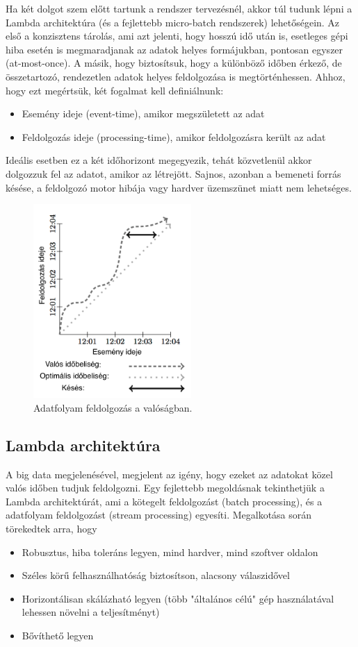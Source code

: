 \documentclass[a4paper,12pt]{article}
\begin{document}
Ha két dolgot szem előtt tartunk a rendszer tervezésnél, akkor túl tudunk lépni a Lambda architektúra (és a fejlettebb micro-batch rendszerek\cite{microbatch}) lehetőségein. Az első a konzisztens tárolás, ami azt jelenti, hogy hosszú idő után is, esetleges gépi hiba esetén is megmaradjanak az adatok helyes formájukban, pontosan egyszer (at-most-once). A másik, hogy biztosítsuk, hogy a különböző időben érkező, de összetartozó, rendezetlen adatok helyes feldolgozása is megtörténhessen. Ahhoz, hogy ezt megértsük, két fogalmat kell definiálnunk:
\begin{itemize}
\item Esemény ideje (event-time), amikor megszületett az adat
\item Feldolgozás ideje (processing-time), amikor feldolgozásra került az adat
\end{itemize}
Ideális esetben ez a két időhorizont megegyezik, tehát közvetlenül akkor dolgozzuk fel az adatot, amikor az létrejött. Sajnos, azonban a bemeneti forrás késése, a feldolgozó motor hibája vagy hardver üzemszünet miatt nem lehetséges. 
 
\begin{figure}[ht!]
\centering
\includegraphics[width=60mm]{img/skew.png}
\caption{Adatfolyam feldolgozás a valóságban.\cite{skew} \label{skew}} 
\end{figure}

\subsection{Lambda architektúra}
A big data megjelenésével, megjelent az igény, hogy ezeket az adatokat közel valós időben tudjuk feldolgozni. Egy fejlettebb megoldásnak tekinthetjük a Lambda architektúrát, ami a kötegelt feldolgozást (batch processing), és a adatfolyam feldolgozást (stream processing) egyesíti. Megalkotása során törekedtek arra, hogy 
\begin{itemize}
\item Robusztus, hiba toleráns legyen, mind hardver, mind szoftver oldalon
\item Széles körű felhasználhatóság biztosítson, alacsony válaszidővel
\item Horizontálisan skálázható legyen (több "általános célú" gép használatával lehessen növelni a teljesítményt)
\item Bővíthető legyen
\end{itemize}
\end{document}
